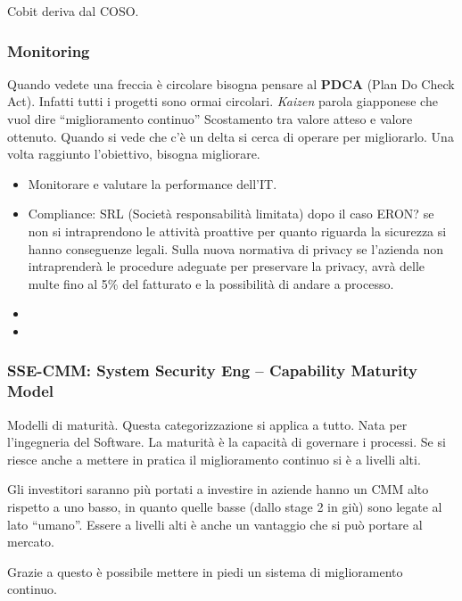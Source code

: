 Cobit deriva dal COSO.

\subsubsection{Monitoring} 
Quando vedete una freccia è circolare bisogna pensare al \textbf{PDCA} (Plan Do 
Check Act). Infatti tutti i progetti sono ormai circolari.  
\emph{Kaizen} parola giapponese che vuol dire ``miglioramento continuo''
Scostamento tra valore atteso e valore ottenuto. Quando si vede che c'è un delta 
 si cerca di operare per migliorarlo.
Una volta raggiunto l'obiettivo, bisogna migliorare.

\begin{itemize}
\item Monitorare e valutare la performance dell'IT.
\item Compliance:
SRL (Società responsabilità limitata) dopo il caso ERON? se non si intraprendono 
le attività proattive per quanto riguarda la sicurezza si hanno conseguenze 
legali.
Sulla nuova normativa di privacy se l'azienda non intraprenderà le procedure 
adeguate per preservare la privacy, avrà delle multe fino al 5\% del fatturato e 
la possibilità di andare a processo.
\item 
\item 
\end{itemize}

\subsubsection{SSE-CMM: System Security Eng -- Capability Maturity Model}
Modelli di maturità. Questa categorizzazione si applica a tutto. Nata per 
l'ingegneria del Software.
La maturità è la capacità di governare i processi. Se si riesce anche a mettere 
in pratica il miglioramento continuo si è a livelli alti.

Gli investitori saranno più portati a investire in aziende hanno un CMM alto 
rispetto a uno basso, in quanto quelle basse (dallo stage 2 in giù) sono legate 
al lato ``umano''. Essere a livelli alti è anche un vantaggio che si può portare 
al mercato.

Grazie a questo è possibile mettere in piedi un sistema di miglioramento 
continuo.

